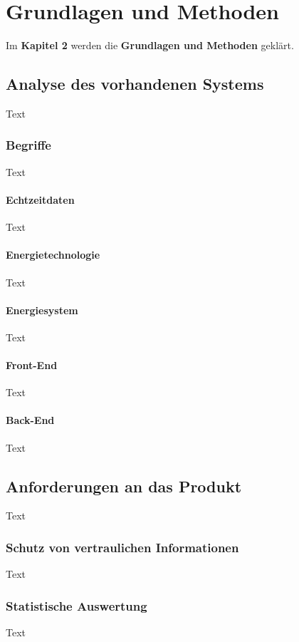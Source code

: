 \chapter{Grundlagen und Methoden}
Im \textbf{Kapitel 2} werden die \textbf{Grundlagen und Methoden} geklärt.


\section{Analyse des vorhandenen Systems}
Text

\subsection{Begriffe}
Text

\subsubsection{Echtzeitdaten}
Text

\subsubsection{Energietechnologie}
Text

\subsubsection{Energiesystem}
Text

\subsubsection{Front-End}
Text

\subsubsection{Back-End}
Text








\section{Anforderungen an das Produkt}
Text

\subsection{Schutz von vertraulichen Informationen}
Text

\subsection{Statistische Auswertung}
Text



